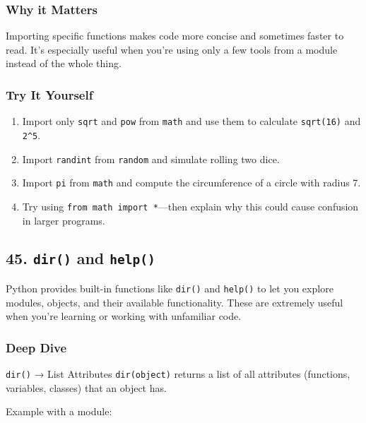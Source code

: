 \documentclass[
  letterpaper,
  DIV=11,
  numbers=noendperiod]{scrreprt}
\providecommand{\tightlist}{%
  \setlength{\itemsep}{0pt}\setlength{\parskip}{0pt}}
\begin{document}
\subsubsection{Why it Matters}\label{why-it-matters-43}

Importing specific functions makes code more concise and sometimes
faster to read. It's especially useful when you're using only a few
tools from a module instead of the whole thing.

\subsubsection{Try It Yourself}\label{try-it-yourself-43}

\begin{enumerate}
\def\labelenumi{\arabic{enumi}.}
\tightlist
\item
  Import only \texttt{sqrt} and \texttt{pow} from \texttt{math} and use
  them to calculate \texttt{sqrt(16)} and \texttt{2\^{}5}.
\item
  Import \texttt{randint} from \texttt{random} and simulate rolling two
  dice.
\item
  Import \texttt{pi} from \texttt{math} and compute the circumference of
  a circle with radius 7.
\item
  Try using \texttt{from\ math\ import\ *}---then explain why this could
  cause confusion in larger programs.
\end{enumerate}

\subsection{\texorpdfstring{45. \texttt{dir()} and
\texttt{help()}}{45. dir() and help()}}\label{dir-and-help}

Python provides built-in functions like \texttt{dir()} and
\texttt{help()} to let you explore modules, objects, and their available
functionality. These are extremely useful when you're learning or
working with unfamiliar code.

\subsubsection{Deep Dive}\label{deep-dive-44}

\texttt{dir()} → List Attributes \texttt{dir(object)} returns a list of
all attributes (functions, variables, classes) that an object has.

Example with a module:
\end{document}
